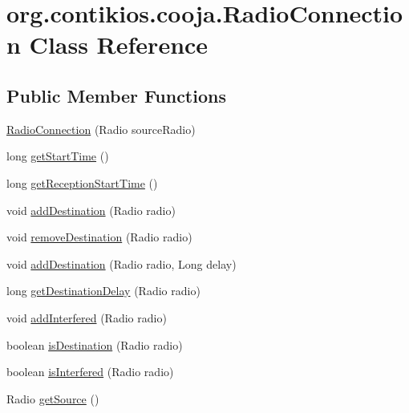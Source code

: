 \hypertarget{classorg_1_1contikios_1_1cooja_1_1RadioConnection}{\section{org.\-contikios.\-cooja.\-Radio\-Connection Class Reference}
\label{classorg_1_1contikios_1_1cooja_1_1RadioConnection}
}
\subsection*{Public Member Functions}
\begin{DoxyCompactItemize}
\item 
\hyperlink{classorg_1_1contikios_1_1cooja_1_1RadioConnection_adeb449c52aa586de0b34c14b8c6ead39}{Radio\-Connection} (Radio source\-Radio)
\item 
long \hyperlink{classorg_1_1contikios_1_1cooja_1_1RadioConnection_ab334a3820d0405a0b2b6aa7683561149}{get\-Start\-Time} ()
\item 
long \hyperlink{classorg_1_1contikios_1_1cooja_1_1RadioConnection_af2bd3c40fa297d883ccb1d2285b0edd1}{get\-Reception\-Start\-Time} ()
\item 
void \hyperlink{classorg_1_1contikios_1_1cooja_1_1RadioConnection_a7faeaa8de29ad4f8499540d0a38a0c4b}{add\-Destination} (Radio radio)
\item 
void \hyperlink{classorg_1_1contikios_1_1cooja_1_1RadioConnection_a988eb4ce5c7a4fcac7a535134c11d2a8}{remove\-Destination} (Radio radio)
\item 
void \hyperlink{classorg_1_1contikios_1_1cooja_1_1RadioConnection_a83d1396b6ef027e9c795777deff20d11}{add\-Destination} (Radio radio, Long delay)
\item 
long \hyperlink{classorg_1_1contikios_1_1cooja_1_1RadioConnection_ac2b68a135d0452a53561609d8c5aa943}{get\-Destination\-Delay} (Radio radio)
\item 
void \hyperlink{classorg_1_1contikios_1_1cooja_1_1RadioConnection_acaff68ac6d8f5dc265c2a51e9a7439bc}{add\-Interfered} (Radio radio)
\item 
boolean \hyperlink{classorg_1_1contikios_1_1cooja_1_1RadioConnection_aea0b41548059472407b9c33fa62734ea}{is\-Destination} (Radio radio)
\item 
boolean \hyperlink{classorg_1_1contikios_1_1cooja_1_1RadioConnection_a4a0dfb86d28970240ddd53132c24d300}{is\-Interfered} (Radio radio)
\item 
Radio \hyperlink{classorg_1_1contikios_1_1cooja_1_1RadioConnection_aa360f2c130d032769b2d78c895041c71}{get\-Source} ()

\end{DoxyCompactItemize}
